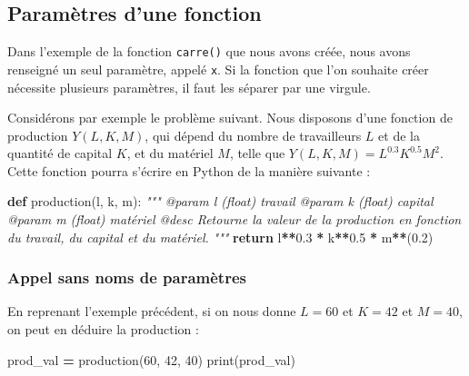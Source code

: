 \documentclass[12pt,]{book}
\newenvironment{Shaded}{\begin{snugshade}}{\end{snugshade}}
\newcommand{\KeywordTok}[1]{\textcolor[rgb]{0.13,0.29,0.53}{\textbf{#1}}}
\newcommand{\DecValTok}[1]{\textcolor[rgb]{0.00,0.00,0.81}{#1}}
\newcommand{\FloatTok}[1]{\textcolor[rgb]{0.00,0.00,0.81}{#1}}
\newcommand{\CommentTok}[1]{\textcolor[rgb]{0.56,0.35,0.01}{\textit{#1}}}
\newcommand{\ControlFlowTok}[1]{\textcolor[rgb]{0.13,0.29,0.53}{\textbf{#1}}}
\newcommand{\OperatorTok}[1]{\textcolor[rgb]{0.81,0.36,0.00}{\textbf{#1}}}
\newcommand{\BuiltInTok}[1]{#1}
\newcommand{\NormalTok}[1]{#1}
\numberwithin{equation}{section}
\numberwithin{countremarque}{section}
\begin{document}
\subsection{Paramètres d'une fonction}\label{parametres-dune-fonction}

Dans l'exemple de la fonction \texttt{carre()} que nous avons créée,
nous avons renseigné un seul paramètre, appelé \texttt{x}. Si la
fonction que l'on souhaite créer nécessite plusieurs paramètres, il faut
les séparer par une virgule.

Considérons par exemple le problème suivant. Nous disposons d'une
fonction de production \(Y(L, K, M)\), qui dépend du nombre de
travailleurs \(L\) et de la quantité de capital \(K\), et du matériel
\(M\), telle que \(Y(L, K, M) = L^{0.3} K^{0.5}M^2\). Cette fonction
pourra s'écrire en Python de la manière suivante :

\begin{Shaded}
\begin{Highlighting}[]
\KeywordTok{def}\NormalTok{ production(l, k, m):}
  \CommentTok{"""}
\CommentTok{  @param l (float) travail}
\CommentTok{  @param k (float) capital}
\CommentTok{  @param m (float) matériel}
\CommentTok{  @desc Retourne la valeur de la production en fonction}
\CommentTok{    du travail, du capital et du matériel.}
\CommentTok{  """}
  \ControlFlowTok{return}\NormalTok{ l}\OperatorTok{**}\FloatTok{0.3} \OperatorTok{*}\NormalTok{ k}\OperatorTok{**}\FloatTok{0.5} \OperatorTok{*}\NormalTok{ m}\OperatorTok{**}\NormalTok{(}\FloatTok{0.2}\NormalTok{)}
\end{Highlighting}
\end{Shaded}

\subsubsection{Appel sans noms de
paramètres}\label{appel-sans-noms-de-parametres}

En reprenant l'exemple précédent, si on nous donne \(L = 60\) et
\(K = 42\) et \(M = 40\), on peut en déduire la production :

\begin{Shaded}
\begin{Highlighting}[]
\NormalTok{prod_val }\OperatorTok{=}\NormalTok{ production(}\DecValTok{60}\NormalTok{, }\DecValTok{42}\NormalTok{, }\DecValTok{40}\NormalTok{)}
\BuiltInTok{print}\NormalTok{(prod_val)}
\end{Highlighting}
\end{Shaded}
\end{document}
